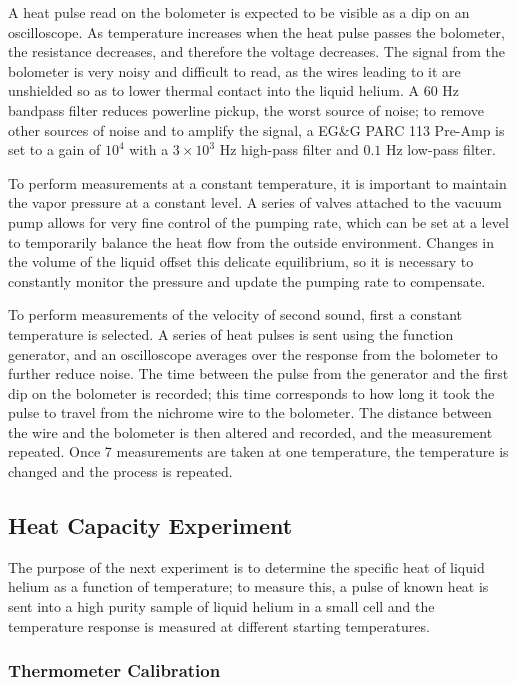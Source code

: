A heat pulse read on the bolometer is expected to be visible as a dip
on an oscilloscope. As temperature increases when the heat pulse
passes the bolometer, the resistance decreases, and therefore the
voltage decreases. The signal from the bolometer is very noisy and
difficult to read, as the wires leading to it are unshielded so as to
lower thermal contact into the liquid helium. A $60$ Hz bandpass
filter reduces powerline pickup, the worst source of noise; to remove
other sources of noise and to amplify the signal, a EG\&G PARC 113
Pre-Amp is set to a gain of $10^4$ with a $3\times 10^3$ Hz high-pass
filter and $0.1$ Hz low-pass filter.

To perform measurements at a constant temperature, it is important to maintain the vapor pressure at a constant level. A series of valves attached to the vacuum pump allows for very fine control of the pumping rate, which can be set at a level to temporarily balance the heat flow from the outside environment. Changes in the volume of the liquid offset this delicate equilibrium, so it is necessary to constantly monitor the pressure and update the pumping rate to compensate.

To perform measurements of the velocity of second sound, first a constant temperature is selected. A series of heat pulses is sent using the function generator, and an oscilloscope averages over the response from the bolometer to further reduce noise. The time between the pulse from the generator and the first dip on the bolometer is recorded; this time corresponds to how long it took the pulse to travel from the nichrome wire to the bolometer. The distance between the wire and the bolometer is then altered and recorded, and the measurement repeated. Once 7 measurements are taken at one temperature, the temperature is changed and the process is repeated.

\subsection{Heat Capacity Experiment}\label{heatcapacityexperiment}

The purpose of the next experiment is to determine the specific heat of liquid helium as a function of temperature; to measure this, a pulse of known heat is sent into a high purity sample of liquid helium in a small cell and the temperature response is measured at different starting temperatures.

\subsubsection{Thermometer Calibration}\label{thermometercalibration}

